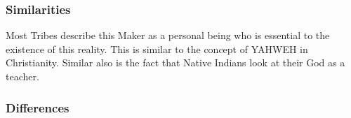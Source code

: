 \documentclass[11pt,a4paper]{scrartcl} %
\begin{document}
     \subsubsection{Similarities}
     Most Tribes describe this Maker as a personal being who is essential to the existence of this reality. This is similar to the  concept of YAHWEH in Christianity. Similar also is the fact that Native Indians look at their God as a teacher.
     \subsubsection{Differences}
   
\clearpage
    \nocite{*}
    
    
\end{document}
